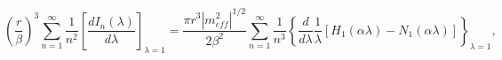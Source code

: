 \begin{equation}
\left(\frac{r}{\beta }\right)^{3}\sum _{n=1}^{\infty }\frac{1}{n^{2}}\left[\frac{dI_{n}\left(\lambda \right)}{d\lambda }\right]_{\lambda =1}=\frac{\pi r^{3}\left|m_{eff}^{2}\right|^{1/2}}{2\beta ^{2}}\sum _{n=1}^{\infty }\frac{1}{n^{3}}\left\{ \frac{d}{d\lambda }\frac{1}{\lambda }\left[H_{1}\left(\alpha \lambda \right)-N_{1}\left(\alpha \lambda \right)\right]\right\} _{\lambda =1},\end{equation}

